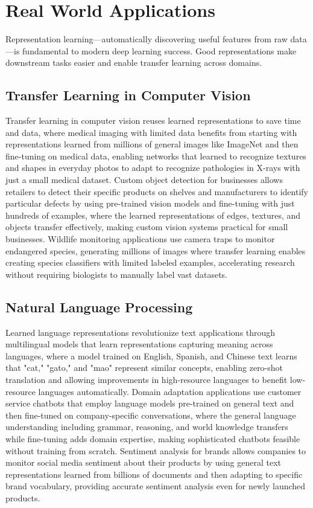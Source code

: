 
\section{Real World Applications}
\label{sec:representation-real-world}


Representation learning—automatically discovering useful features from raw data—is fundamental to modern deep learning success. Good representations make downstream tasks easier and enable transfer learning across domains.

\subsection{Transfer Learning in Computer Vision}

Transfer learning in computer vision reuses learned representations to save time and data, where medical imaging with limited data benefits from starting with representations learned from millions of general images like ImageNet and then fine-tuning on medical data, enabling networks that learned to recognize textures and shapes in everyday photos to adapt to recognize pathologies in X-rays with just a small medical dataset. Custom object detection for businesses allows retailers to detect their specific products on shelves and manufacturers to identify particular defects by using pre-trained vision models and fine-tuning with just hundreds of examples, where the learned representations of edges, textures, and objects transfer effectively, making custom vision systems practical for small businesses. Wildlife monitoring applications use camera traps to monitor endangered species, generating millions of images where transfer learning enables creating species classifiers with limited labeled examples, accelerating research without requiring biologists to manually label vast datasets.

\subsection{Natural Language Processing}

Learned language representations revolutionize text applications through multilingual models that learn representations capturing meaning across languages, where a model trained on English, Spanish, and Chinese text learns that "cat," "gato," and "mao" represent similar concepts, enabling zero-shot translation and allowing improvements in high-resource languages to benefit low-resource languages automatically. Domain adaptation applications use customer service chatbots that employ language models pre-trained on general text and then fine-tuned on company-specific conversations, where the general language understanding including grammar, reasoning, and world knowledge transfers while fine-tuning adds domain expertise, making sophisticated chatbots feasible without training from scratch. Sentiment analysis for brands allows companies to monitor social media sentiment about their products by using general text representations learned from billions of documents and then adapting to specific brand vocabulary, providing accurate sentiment analysis even for newly launched products.

